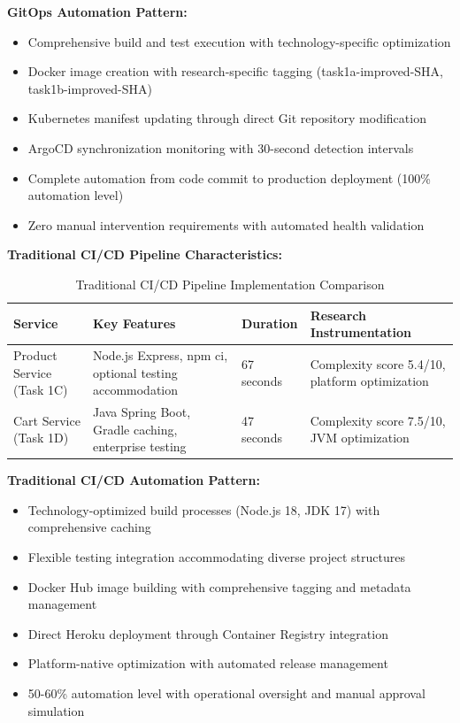 \textbf{GitOps Automation Pattern:}
\begin{itemize}
\item Comprehensive build and test execution with technology-specific optimization
\item Docker image creation with research-specific tagging (task1a-improved-SHA, task1b-improved-SHA)
\item Kubernetes manifest updating through direct Git repository modification
\item ArgoCD synchronization monitoring with 30-second detection intervals
\item Complete automation from code commit to production deployment (100\% automation level)
\item Zero manual intervention requirements with automated health validation
\end{itemize}

\textbf{Traditional CI/CD Pipeline Characteristics:}

\begin{table}[H]
\centering
\caption{Traditional CI/CD Pipeline Implementation Comparison}
\label{tab:traditional-pipeline-comparison}
\begin{tabular}{|p{3cm}|p{4cm}|p{3cm}|p{4cm}|}
\hline
\textbf{Service} & \textbf{Key Features} & \textbf{Duration} & \textbf{Research Instrumentation} \\
\hline
Product Service (Task 1C) & Node.js Express, npm ci, optional testing accommodation & 67 seconds & Complexity score 5.4/10, platform optimization \\
\hline
Cart Service (Task 1D) & Java Spring Boot, Gradle caching, enterprise testing & 47 seconds & Complexity score 7.5/10, JVM optimization \\
\hline
\end{tabular}
\end{table}

\textbf{Traditional CI/CD Automation Pattern:}
\begin{itemize}
\item Technology-optimized build processes (Node.js 18, JDK 17) with comprehensive caching
\item Flexible testing integration accommodating diverse project structures
\item Docker Hub image building with comprehensive tagging and metadata management
\item Direct Heroku deployment through Container Registry integration
\item Platform-native optimization with automated release management
\item 50-60\% automation level with operational oversight and manual approval simulation
\end{itemize}

